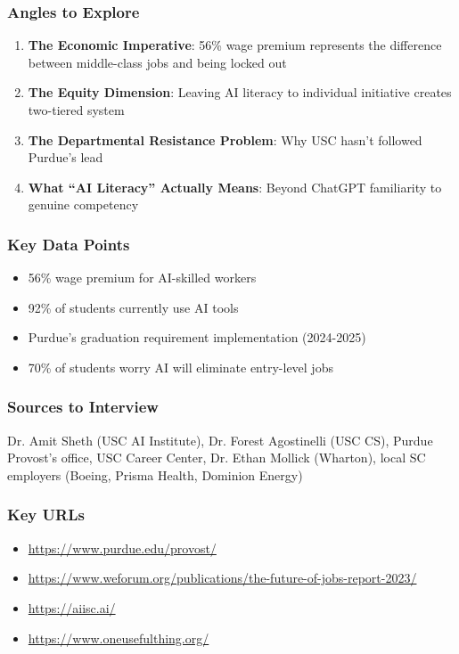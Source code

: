 \documentclass[11pt,letterpaper]{article}
\begin{document}
\subsubsection*{Angles to Explore}
\begin{enumerate}[noitemsep]
    \item \textbf{The Economic Imperative}: 56\% wage premium represents the difference between middle-class jobs and being locked out
    \item \textbf{The Equity Dimension}: Leaving AI literacy to individual initiative creates two-tiered system
    \item \textbf{The Departmental Resistance Problem}: Why USC hasn't followed Purdue's lead
    \item \textbf{What ``AI Literacy'' Actually Means}: Beyond ChatGPT familiarity to genuine competency
\end{enumerate}

\subsubsection*{Key Data Points}
\begin{itemize}[noitemsep]
    \item 56\% wage premium for AI-skilled workers
    \item 92\% of students currently use AI tools
    \item Purdue's graduation requirement implementation (2024-2025)
    \item 70\% of students worry AI will eliminate entry-level jobs
\end{itemize}

\subsubsection*{Sources to Interview}
Dr. Amit Sheth (USC AI Institute), Dr. Forest Agostinelli (USC CS), Purdue Provost's office, USC Career Center, Dr. Ethan Mollick (Wharton), local SC employers (Boeing, Prisma Health, Dominion Energy)

\subsubsection*{Key URLs}
\begin{itemize}[noitemsep]
    \item \url{https://www.purdue.edu/provost/}
    \item \url{https://www.weforum.org/publications/the-future-of-jobs-report-2023/}
    \item \url{https://aiisc.ai/}
    \item \url{https://www.oneusefulthing.org/}
\end{itemize}
\end{document}
